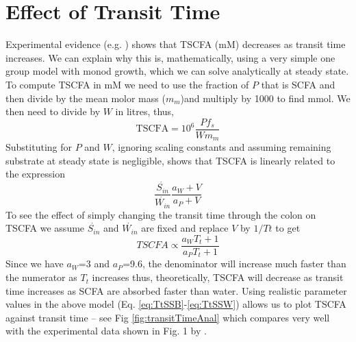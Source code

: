 \documentclass[a4paper]{article}
\begin{document}
\section{Effect of Transit Time}
Experimental evidence (e.g. \citep{Lewis}) shows that TSCFA (mM) decreases as transit time increases. We can explain why this is, mathematically, using a very simple one group model with monod growth, which we can solve analytically at steady state.
To compute TSCFA in mM we need to use the fraction of $P$ that is SCFA and then divide by the mean molor mass ($m_m$)and multiply by 1000 to find mmol. We then need to divide by $W$ in litres, thus,
\begin{equation}
\mbox{TSCFA}=10^6\frac{Pf_s}{W m_m}
\end{equation}
Substituting for $P$ and $W$, ignoring scaling constants and assuming remaining substrate at steady state is negligible, shows that TSCFA is linearly related to the expression
\begin{equation}
\frac{\dot{S_{in}}}{\dot{W_{in}}}\frac{a_W+V}{a_P+V}
\end{equation}
To see the effect of simply changing the transit time through the colon on TSCFA we assume $\dot{S_{in}}$ and $\dot{W_{in}}$ are fixed and replace $V$ by $1/Tt$ to get
\begin{equation}
TSCFA \propto \frac{a_WT_t+1}{a_PT_t+1}
\end{equation}
Since we have $a_W$=3 and $a_P$=9.6, the denominator will increase much faster than the numerator as $T_t$ increases thus, theoretically, TSCFA will decrease as transit time increases as SCFA are absorbed faster than water.
Using realistic parameter values in the above model (Eq. \ref{eq:TtSSB}-\ref{eq:TtSSW}) allows us to plot TSCFA against transit time  -- see Fig \ref{fig:transitTimeAnal} which compares very well with the experimental data shown in Fig. 1 by \citet{Lewis}.
\end{document}

